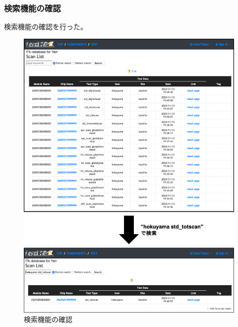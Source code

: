 \clearpage
\subsubsection{検索機能の確認}

検索機能の確認を行った。
\begin{figure}[bpt]\centering
\includegraphics[width=12cm]{demo_search_function}
\caption[検索機能の確認]{検索機能の確認}
\label{demo_search_function}
\end{figure}

\clearpage
